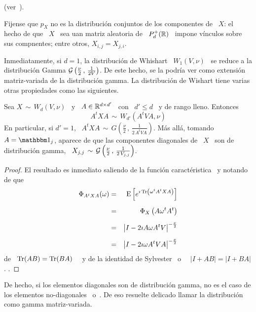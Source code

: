 (ver~\cite{PedRic91, SulTra96, And03}).

Fijense que $p_X$ no es la distribuci\'on conjuntos de los componentes de \ $X$:
el hecho de  que \ $X$ \ sea  uan matriz aleatoria de \  $P_d^+(\mathbb{R})$ \ impone
v\'inculos sobre sus compnentes; entre otros, $X_{i,j} = X_{j,i}$.

Inmediatamente, si  $d = 1$, la  distribuci\'on de Whishart \  $W_1(V,\nu)$ \ se
reduce  a la  distribuci\'on Gamma  $\mathcal{G}\left(\frac{\nu}{2} \,  , \,  \frac1{2 V}
\right)$. De este  hecho, se la podr\'ia ver  como extensi\'on matriz-variada de
la  distribuci\'on  gamma.  La  distribuci\'on  de  Wishart  tiene varias  otras
propiedades como las siguientes.
%
\begin{lema}
\label{Lem:MP:StabilidadWishartLineal}
%
  Sea $X \,  \sim \, W_d(V,\nu)$ \ y \  $A \in \mathbb{R}^{d \times d'}$  \ con \ $d'
  \le d$ \ y de rango lleno. Entonces
  \[
  A^t X A \, \sim \, W_{d'}\left( A^t V A , \nu \right)
  \]
  En particular, si $d'  = 1$, \ $A^t X A \, \sim  \, G\left( \frac{\nu}{2} \, ,
    \, \frac1{2 \, A^t V A} \right)$. M\'as all\'a, tomando $A = \un_j$, aparece
  de que  las componentes diagonales de \  $X$ \ son de  distribuci\'on gamma, \
  $X_{j,j}  \, \sim  \,  \mathcal{G}\left( \frac{\nu}{2}  \,  , \,  \frac1{2 \,  V_{j,j}}
  \right)$.
\end{lema}
%
\begin{proof}
  El     resultado     es     inmediato     saliendo     de     la     funci\'on
  caract\'eristica~\footref{Foot:MP:CaracteristicaWishart} y notando de que
%
\begin{eqnarray*}
\Phi_{A^t X A}(\omega) & = & \Esp\left[ e^{\imath \Tr\left( \omega^t A^t X A
\right)}\right]\\[2mm]
%
& = & \Phi_X\left( A \omega^t A^t\right)\\[2mm]
%
& = &  \left| I - 2 \imath A \omega A^t V \right|^{-\frac{\nu}{2}}\\[2mm]
%
& = &  \left| I - 2 \imath \omega A^t V A \right|^{-\frac{\nu}{2}}
%
\end{eqnarray*}
%
de   \   $\operatorname{Tr}(AB)   =   \operatorname{Tr}(BA)$~\cite{Har08}   \   y   de   la   identidad   de
Sylvester~\cite{Syl51,  AkrAkr96}  o~\cite[\S~18.1]{Har08} \  $\left|  I  + A  B
\right| = \left| I + B A \right|$.  .
\end{proof}
%
De hecho, si los elementos diagonales son de distribuci\'on gamma, no es el caso
de         los        elementos         no-diagonales~\cite{Seb04,        And03}
o~\cite[Teo.~3.3.4]{GupNag99}.    De    eso   resuelte   delicado    llamar   la
distribuci\'on como gamma matriz-variada.

